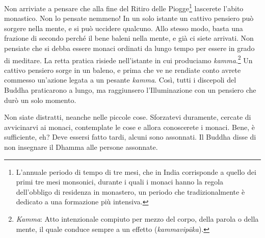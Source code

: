 Non arriviate a pensare che alla fine del Ritiro delle Piogge\footnote{L'annuale
  periodo di tempo di tre mesi, che in India corrisponde a quello dei
  primi tre mesi monsonici, durante i quali i monaci hanno la regola
  dell'obbligo di residenza in monastero, un periodo che
  tradizionalmente è dedicato a una formazione più intensiva.} lascerete
l'abito monastico. Non lo pensate nemmeno! In un solo istante un cattivo
pensiero può sorgere nella mente, e si può uccidere qualcuno. Allo
stesso modo, basta una frazione di secondo perché il bene baleni nella
mente, e già ci siete arrivati. Non pensiate che si debba essere monaci
ordinati da lungo tempo per essere in grado di meditare. La retta
pratica risiede nell'istante in cui produciamo \emph{kamma}.\footnote{%
  \emph{Kamma}:
  Atto intenzionale compiuto per mezzo del corpo, della parola o della
  mente, il quale conduce sempre a un effetto (\emph{kammavipāka}).}
Un cattivo pensiero sorge in un baleno, e prima che ve ne rendiate conto
avrete commesso un'azione legata a un pesante \emph{kamma}. Così, tutti
i discepoli del Buddha praticarono a lungo, ma raggiunsero
l'Illuminazione con un pensiero che durò un solo momento.

Non siate distratti, neanche nelle piccole cose. Sforzatevi duramente,
cercate di avvicinarvi ai monaci, contemplate le cose e allora
conoscerete i monaci. Bene, è sufficiente, eh? Deve essersi fatto tardi,
alcuni sono assonnati. Il Buddha disse di non insegnare il Dhamma alle
persone assonnate.

